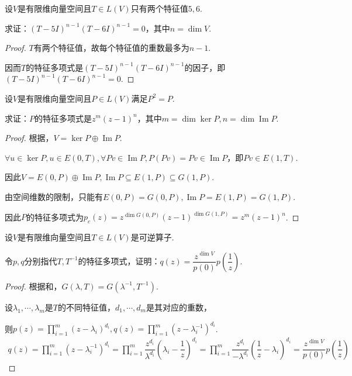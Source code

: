 \begin{problem}[2]\label{8.C.2}
    设\(V\)是有限维向量空间且\(T \in L(V)\)只有两个特征值\(5,6\).

    求证：\((T-5I)^{n-1}(T-6I)^{n-1}=0\)，其中\(n=\dim V\).
\end{problem}

\begin{proof}
    \(T\)有两个特征值，故每个特征值的重数最多为\(n-1\).

    因而\(T\)的特征多项式是\((T-5I)^{n-1}(T-6I)^{n-1}\)的因子，即\((T-5I)^{n-1}(T-6I)^{n-1}=0\).
\end{proof}

\begin{problem}[7]\label{8.C.7}
    设\(V\)是有限维向量空间且\(P \in L(V)\)满足\(P^2=P\).

    求证：\(P\)的特征多项式是\(z^m(z-1)^n\)，其中\(m=\dim \ker P,n=\dim \operatorname{Im} P\).
\end{problem}

\begin{proof}
    根据，\(V=\ker P \oplus \operatorname{Im} P\).

    \(\forall u \in \ker P,u \in E(0,T), \forall Pv \in \operatorname{Im} P,P(Pv)=Pv \in \operatorname{Im} P\)，即\(Pv \in E(1,T)\).
    
    因此\(V=E(0,P) \oplus \operatorname{Im} P,\operatorname{Im} P \subseteq E(1,P) \subseteq G(1,P)\).
    
    由空间维数的限制，只能有\(E(0,P)=G(0,P),\operatorname{Im} P=E(1,P)=G(1,P)\).
    
    因此\(P\)的特征多项式为\(p_c(z)=z^{\dim G(0,P)}(z-1)^{\dim G(1,P)}=z^m(z-1)^n\).
\end{proof}

\newpage

\begin{problem}[10]\label{8.C.10}
    设\(V\)是有限维向量空间且\(T \in L(V)\)是可逆算子.

    令\(p,q\)分别指代\(T,T^{-1}\)的特征多项式，证明：\(q(z)=\dfrac{z^{\dim V}}{p(0)}p(\dfrac{1}{z})\).
\end{problem}

\begin{proof}
    根据和，\(G(\lambda,T)=G(\lambda^{-1},T^{-1})\).

    设\(\lambda_1,\cdots,\lambda_m\)是\(T\)的不同特征值，\(d_1,\cdots,d_m\)是其对应的重数，
    
    则\(p(z)=\prod_{i=1}^m (z-\lambda_i)^{d_i},q(z)=\prod_{i=1}^m (z-\lambda_i^{-1})^{d_i}\).
    \begin{align*}
        q(z)=\prod_{i=1}^m (z-\lambda_i^{-1})^{d_i}
            =\prod_{i=1}^m \dfrac{z^{d_i}}{\lambda^{d_i}}(\lambda_i-\dfrac{1}{z})^{d_i}
            =\prod_{i=1}^m \dfrac{z^{d_i}}{-\lambda^{d_i}}(\dfrac{1}{z}-\lambda_i)^{d_i}
            =\dfrac{z^{\dim V}}{p(0)}p(\dfrac{1}{z})
    \end{align*}
\end{proof}

